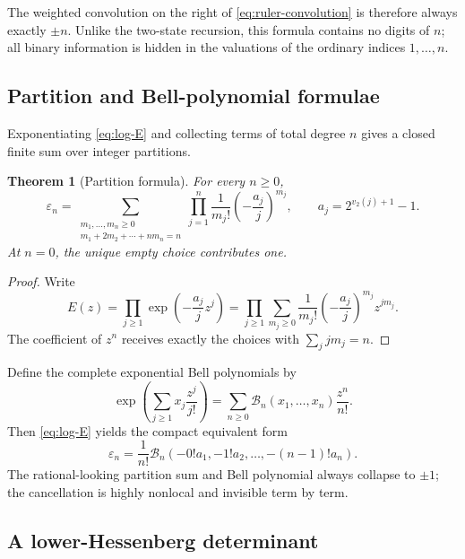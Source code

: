 \documentclass[11pt,oneside]{article}
\newtheorem{theorem}{Theorem}[section]
\theoremstyle{definition}
\theoremstyle{remark}
\newcommand{\vtwo}{v_2}
\newcommand{\eps}{\varepsilon}
\newcommand{\Bell}{\mathcal B}
\begin{document}
The weighted convolution on the right of \eqref{eq:ruler-convolution} is therefore always
exactly \(\pm n\).  Unlike the two-state recursion, this formula contains no digits of
\(n\); all binary information is hidden in the valuations of the ordinary indices
\(1,\ldots,n\).

\subsection{Partition and Bell-polynomial formulae}

Exponentiating \eqref{eq:log-E} and collecting terms of total degree \(n\) gives a closed
finite sum over integer partitions.

\begin{theorem}[Partition formula]
\label{thm:partition-formula}
For every \(n\ge0\),
\begin{equation}
  \boxed{
  \eps_n=\sum_{\substack{m_1,\ldots,m_n\ge0\\
                   m_1+2m_2+\cdots+nm_n=n}}
  \prod_{j=1}^{n}\frac1{m_j!}
       \left(-\frac{a_j}{j}\right)^{m_j},
  \qquad a_j=2^{\vtwo(j)+1}-1.}                            \label{eq:partition-formula}
\end{equation}
At \(n=0\), the unique empty choice contributes one.
\end{theorem}

\begin{proof}
Write
\[
  E(z)=\prod_{j\ge1}\exp\!\left(-\frac{a_j}{j}z^j\right)
      =\prod_{j\ge1}\sum_{m_j\ge0}
        \frac1{m_j!}\left(-\frac{a_j}{j}\right)^{m_j}z^{jm_j}.
\]
The coefficient of \(z^n\) receives exactly the choices with \(\sum_jjm_j=n\).
\end{proof}

Define the complete exponential Bell polynomials by
\begin{equation}
  \exp\!\left(\sum_{j\ge1}x_j\frac{z^j}{j!}\right)
   =\sum_{n\ge0}\Bell_n(x_1,\ldots,x_n)\frac{z^n}{n!}.     \label{eq:Bell-definition}
\end{equation}
Then \eqref{eq:log-E} yields the compact equivalent form
\begin{equation}
  \boxed{
  \eps_n=\frac1{n!}\Bell_n(-0!a_1,-1!a_2,\ldots,-(n-1)!a_n).}                  \label{eq:Bell-eps}
\end{equation}
The rational-looking partition sum and Bell polynomial always collapse to \(\pm1\); the
cancellation is highly nonlocal and invisible term by term.

\subsection{A lower-Hessenberg determinant}
\end{document}
